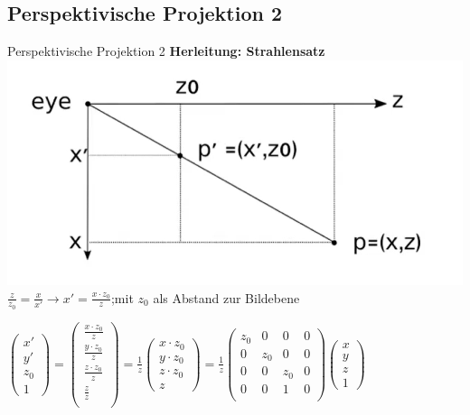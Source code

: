 \documentclass[10pt,aspectratio=169]{beamer}
\begin{document}
  \subsection{Perspektivische Projektion 2}
  \begin{frame}{Perspektivische Projektion 2}
    \textbf{Herleitung: Strahlensatz}\\
    \includegraphics[scale=0.15]{strahlen}\\
    \large$\frac{z}{z_0} = \frac{x}{x'} \rightarrow x'=\frac{x\cdot z_0}{z}$\small;mit $z_0$ als Abstand zur Bildebene\\
    \normalsize
    \begin{center}
      $\begin{pmatrix}
        x'\\
        y'\\
        z_0\\
        1
      \end{pmatrix}
      =
      \begin{pmatrix}
        \frac{x\cdot z_0}{z}\\
        \frac{y\cdot z_0}{z}\\
        \frac{z\cdot z_0}{z}\\
        \frac{z}{z}\\
      \end{pmatrix}
      =
      \frac{1}{z}
      \begin{pmatrix}
        x\cdot z_0\\
        y\cdot z_0\\
        z\cdot z_0\\
        z
      \end{pmatrix}
      = \frac{1}{z}
      \begin{pmatrix}
        z_0 & 0 & 0 & 0\\
        0 & z_0 & 0 & 0\\
        0 & 0 & z_0 & 0\\
        0 & 0 & 1 & 0\\
      \end{pmatrix}
      \begin{pmatrix}
        x\\y\\z\\1
      \end{pmatrix}
      $
    \end{center}
  \end{frame}
\end{document}
